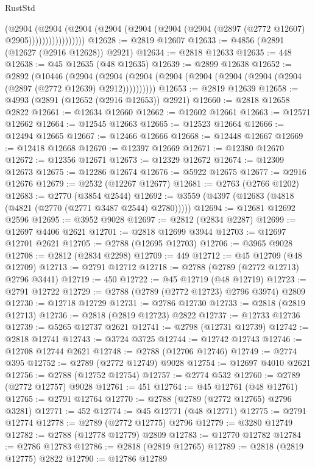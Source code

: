 \begin{lexlean}{RustStd}
\begin{coremodule}
                      (@2904
                        (@2904
                          (@2904
                            (@2904 (@2904 (@2904 (@2904 (@2897 (@2772 @12607) @2905)))))))))))))))))
@12628 := @2819 @12607
@12633 := @4856 (@2891 (@12627 (@2916 @12628)) @2921)
@12634 := @2818 @12633
@12635 := 448
@12638 := @45 @12635 (@48 @12635)
@12639 := @2899 @12638
@12652 := @2892
    (@10446
      (@2904 (@2904 (@2904 (@2904 (@2904 (@2904 (@2904 (@2904 (@2897 (@2772 @12639) @2912))))))))))
@12653 := @2819 @12639
@12658 := @4993 (@2891 (@12652 (@2916 @12653)) @2921)
@12660 := @2818 @12658 @2822
@12661 := @12634 @12660
@12662 := @12602 @12661
@12663 := @12571 @12662
@12664 := @12545 @12663
@12665 := @12523 @12664
@12666 := @12494 @12665
@12667 := @12466 @12666
@12668 := @12448 @12667
@12669 := @12418 @12668
@12670 := @12397 @12669
@12671 := @12380 @12670
@12672 := @12356 @12671
@12673 := @12329 @12672
@12674 := @12309 @12673
@12675 := @12286 @12674
@12676 := @5922 @12675
@12677 := @2916 @12676
@12679 := @2532 (@12267 @12677)
@12681 := @2763 (@2766 @1202)
@12683 := @2770 (@3854 @2544)
@12692 := @3559 (@4397 (@12683 (@4818 (@4821 (@2770 (@2771 @3487 @2544) @2780)))))
@12694 := @12681 @12692 @2596
@12695 := @3952 @9028
@12697 := @2812 (@2834 @2287)
@12699 := @12697 @4406 @2621
@12701 := @2818 @12699 @3944
@12703 := @12697 @12701 @2621
@12705 := @2788 (@12695 @12703)
@12706 := @3965 @9028
@12708 := @2812 (@2834 @2298)
@12709 := 449
@12712 := @45 @12709 (@48 @12709)
@12713 := @2791 @12712
@12718 := @2788 (@2789 (@2772 @12713) @2796 @3441)
@12719 := 450
@12722 := @45 @12719 (@48 @12719)
@12723 := @2791 @12722
@12729 := @2788 (@2789 (@2772 @12723) @2796 @3974) @2809
@12730 := @12718 @12729
@12731 := @2786 @12730
@12733 := @2818 (@2819 @12713)
@12736 := @2818 (@2819 @12723) @2822
@12737 := @12733 @12736
@12739 := @5265 @12737 @2621
@12741 := @2798 (@12731 @12739)
@12742 := @2818 @12741
@12743 := @3724 @3725
@12744 := @12742 @12743
@12746 := @12708 @12744 @2621
@12748 := @2788 (@12706 @12746)
@12749 := @2774 @395
@12752 := @2789 (@2772 @12749) @9028
@12754 := @12697 @4010 @2621
@12756 := @2788 (@12752 @12754)
@12757 := @2774 @532
@12760 := @2789 (@2772 @12757) @9028
@12761 := 451
@12764 := @45 @12761 (@48 @12761)
@12765 := @2791 @12764
@12770 := @2788 (@2789 (@2772 @12765) @2796 @3281)
@12771 := 452
@12774 := @45 @12771 (@48 @12771)
@12775 := @2791 @12774
@12778 := @2789 (@2772 @12775) @2796
@12779 := @3280 @12749
@12782 := @2788 (@12778 @12779) @2809
@12783 := @12770 @12782
@12784 := @2786 @12783
@12786 := @2818 (@2819 @12765)
@12789 := @2818 (@2819 @12775) @2822
@12790 := @12786 @12789

\end{coremodule}
\end{lexlean}
